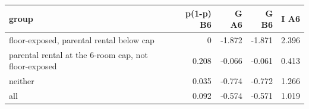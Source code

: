 \begin{tabular}{lrrrr}
\toprule
group & p(1-p) B6 & G A6 & G B6 & I A6 \\
\midrule
floor-exposed, parental rental below cap & 0 & -1.872 & -1.871 & 2.396 \\
parental rental at the 6-room cap, not floor-exposed & 0.208 & -0.066 & -0.061 & 0.413 \\
neither & 0.035 & -0.774 & -0.772 & 1.266 \\
all & 0.092 & -0.574 & -0.571 & 1.019 \\
\bottomrule
\end{tabular}
